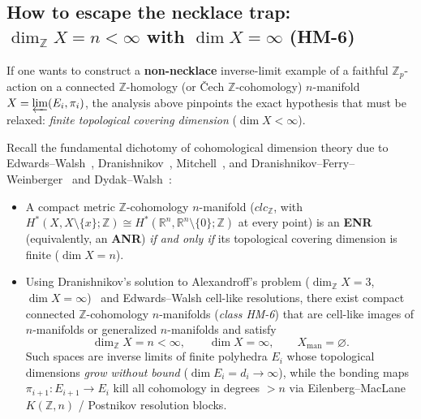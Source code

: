 \documentclass[11pt]{article}
\theoremstyle{definition}
\begin{document}
\subsection{How to escape the necklace trap: $\dim_{\mathbb{Z}}X=n<\infty$ with $\dim X=\infty$ (HM-6)}
\label{sec:dranishnikov}

If one wants to construct a \textbf{non-necklace} inverse-limit example of a
faithful $\mathbb{Z}_p$-action on a connected $\mathbb{Z}$-homology (or
\v{C}ech $\mathbb{Z}$-cohomology) $n$-manifold $X=\varprojlim(E_i,\pi_i)$, the
analysis above pinpoints the exact hypothesis that must be relaxed:
\emph{finite topological covering dimension} ($\dim X<\infty$).

Recall the fundamental dichotomy of cohomological dimension theory due to
Edwards--Walsh~\cite{walsh1981}, Dranishnikov~\cite{dranishnikov1988},
Mitchell~\cite{mitchell1990}, and
Dranishnikov--Ferry--Weinberger~\cite{dfw2006} and
Dydak--Walsh~\cite{dydakwalsh1993}:
\begin{itemize}
\item A compact metric $\mathbb{Z}$-cohomology $n$-manifold ($clc_{\mathbb{Z}}$,
with $H^*(X,X\setminus\{x\};\mathbb{Z})\cong H^*(\mathbb{R}^n,\mathbb{R}^n\setminus\{0\};\mathbb{Z})$
at every point) is an \textbf{ENR} (equivalently, an \textbf{ANR})
\emph{if and only if} its topological covering dimension is finite
($\dim X=n$).
\item Using Dranishnikov's solution to Alexandroff's problem ($\dim_{\mathbb{Z}}X=3$,
$\dim X=\infty$)~\cite{dranishnikov1988} and Edwards--Walsh cell-like
resolutions, there exist compact connected $\mathbb{Z}$-cohomology
$n$-manifolds (\emph{class HM-6}) that are cell-like images of $n$-manifolds or
generalized $n$-manifolds and satisfy
\[
\dim_{\mathbb{Z}}X = n < \infty, \qquad \dim X = \infty, \qquad
X_{\mathrm{man}}=\varnothing.
\]
Such spaces are inverse limits of finite polyhedra $E_i$ whose topological
dimensions \emph{grow without bound} ($\dim E_i = d_i \to \infty$), while the
bonding maps $\pi_{i+1}:E_{i+1}\to E_i$ kill all cohomology in degrees $>n$
via Eilenberg--MacLane $K(\mathbb{Z},n)$ / Postnikov resolution blocks.
\end{itemize}
\end{document}
